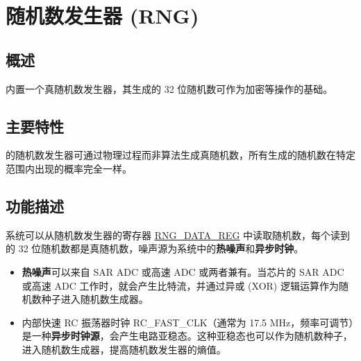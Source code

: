 \documentclass[main\_\_CN.tex]{subfiles}
\begin{document}

\ifglobal
\else
    {\let\clearpage\relax \listoftodos}
    {\let\clearpage\relax \listofdonetodos}
    \tableofcontents
\fi



\hypertarget{rng}{}
\chapter{随机数发生器 (RNG)}\label{mod:rng}

\section{概述}

\chipname{} 内置一个真随机数发生器，其生成的 32 位随机数可作为加密等操作的基础。

\section{主要特性}

\chipname{} 的随机数发生器可通过物理过程而非算法生成真随机数，所有生成的随机数在特定范围内出现的概率完全一样。

\section{功能描述}\label{sec:rng-func-descr}

系统可以从随机数发生器的寄存器 \hyperref[regdesc:RNGDATAREG]{RNG\_DATA\_REG} 中读取随机数，每个读到的 32 位随机数都是真随机数，噪声源为系统中的\textbf{热噪声}和\textbf{异步时钟}。

\begin{itemize}
    \item \textbf{热噪声}可以来自 SAR ADC 或高速 ADC 或两者兼有。当芯片的 SAR ADC 或高速 ADC 工作时，就会产生比特流，并通过异或 (XOR) 逻辑运算作为随机数种子进入随机数生成器。
    \item 内部快速 RC 振荡器时钟 RC\_FAST\_CLK（通常为 17.5 MHz，频率可调节）是一种\textbf{异步时钟源}，会产生电路亚稳态。这种亚稳态也可以作为随机数种子，进入随机数生成器，提高随机数发生器的熵值。
\end{itemize}
\end{document}
